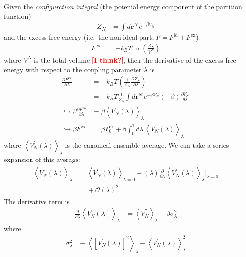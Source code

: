 \documentclass[letterpaper,twocolumn,amsmath,amssymb,prb]{revtex4-1}
\newcommand{\kT}{\ensuremath{k_BT}}
\newcommand{\1}{\ensuremath{\textbf{r}_1}}
\newcommand{\2}{\ensuremath{\textbf{r}_2}}
\newcommand{\fixme}[1]{\textcolor{red}{\textbf{[#1]}}}
\begin{document}
Given the \emph{configuration integral} (the potenial energy component of the partition function)
\begin{align}
  Z_N &= \int d\mathbf{r}^N\, e^{-\beta V_N}
\end{align}
and the excess free energy (i.e.~the non-ideal part; $F = F^\text{id} + F^\text{ex}$)
\begin{align}
  F^\text{ex} &= -\kT\ln\left( \frac{Z_N}{V^N} \right)
\end{align}
where $V^N$ is the total volume \fixme{I think?}, then the derivative of the excess free energy with respect to the coupling parameter $\lambda$ is
\begin{align}
  \frac{\partial F^\text{ex}}{\partial\lambda} &= -\kT\left( \frac{1}{Z_N}\frac{\partial Z_N}{\partial\lambda} \right) \\
  &= -\kT\frac{1}{Z_N}\int d\mathbf{r}^N\, e^{-\beta V_N}(-\beta)\frac{\partial V_N}{\partial\lambda} \\
  \hookrightarrow \beta\frac{\partial F^\text{ex}}{\partial\lambda} &= \beta\left\langle V_N^{'}(\lambda) \right\rangle_\lambda \\
  \hookrightarrow \beta F^\text{ex} &= \beta F^\text{ex}_0 + \beta\int_0^1 d\lambda\, \left\langle V_N^{'}(\lambda) \right\rangle_\lambda
\end{align}
where $\left\langle V_N^{'}(\lambda) \right\rangle_\lambda$ is the canonical ensemble average. We can take a series expansion of this average:
\begin{align}\begin{split} %
  \left\langle V_N^{'}(\lambda) \right\rangle_\lambda = &{} \left\langle V_N^{'}(\lambda)\right\rangle_{\lambda = 0} + (\lambda)\frac{\partial}{\partial\lambda}\left\langle V_N^{'}(\lambda) \right\rangle_{\lambda}\bigg|_{\lambda = 0} \\ &{} + \mathcal{O}(\lambda)^2
\end{split}\end{align}
The derivative term is
\begin{align}
  \frac{\partial}{\partial\lambda}\left\langle V_N^{'}(\lambda) \right\rangle_{\lambda} &= \left\langle V_N^{''} \right\rangle_\lambda - \beta\sigma_\lambda^2
\end{align}
where
\begin{align}
  \sigma_\lambda^2 &\equiv \left\langle \left[ V_N^{'}(\lambda) \right]^2 \right\rangle_\lambda - \left\langle V_N^{'}(\lambda) \right\rangle^2_\lambda
\end{align}
\end{document}
